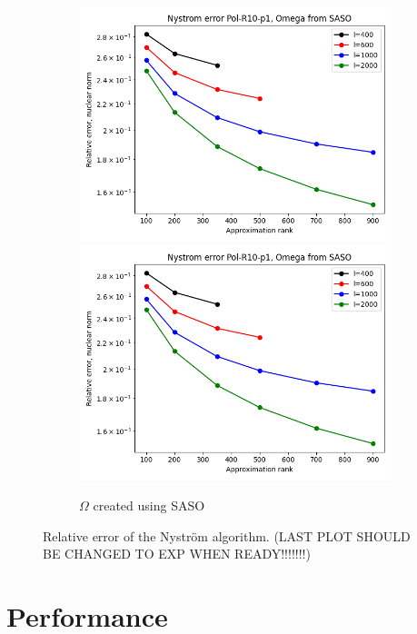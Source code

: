 \documentclass{article}
\theoremstyle{definition}
\begin{document}
\begin{figure}
\begin{subfigure}[t]{0.4\textwidth}
    \includegraphics[width=\textwidth]{plots/relerror/relerror_Pol-R10-p1_SASO.png}
    \includegraphics[width=\textwidth]{plots/relerror/relerror_Pol-R10-p1_SASO.png}
    \caption{$\Omega$ created using SASO}
\end{subfigure}\hfill
\caption{Relative error of the Nyström algorithm. (LAST PLOT SHOULD BE CHANGED TO EXP WHEN READY!!!!!!!)}
\label{fig:RelError}
\end{figure}

\section{Performance} \label{sec:performance}
\end{document}
